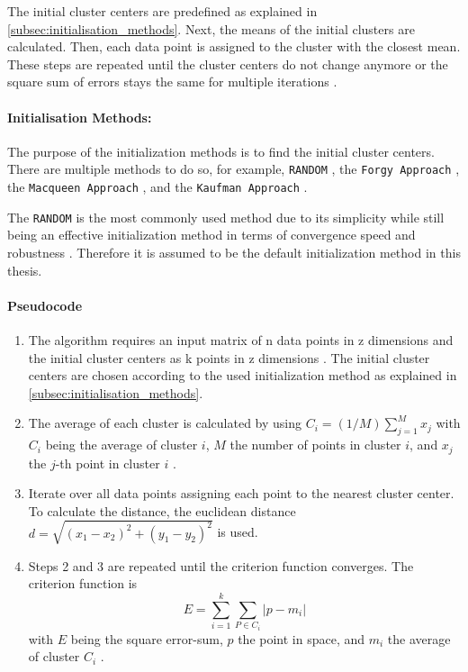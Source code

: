 The initial cluster centers are predefined as explained in \autoref*{subsec:initialisation_methods}.
Next, the means of the initial clusters are calculated.
Then, each data point is assigned to the cluster with the closest mean.
These steps are repeated until the cluster centers do not change anymore or the square sum of errors stays the same for multiple iterations \cite{HAR-KMA}.

\paragraph*{Initialisation Methods:}
\label{subsec:initialisation_methods}
The purpose of the initialization methods is to find the initial cluster centers.
There are multiple methods to do so, for example, \texttt{RANDOM} \cite{PEN-ECI}, the \texttt{Forgy Approach} \cite{AND-CAA}, the \texttt{Macqueen Approach} \cite{MCQ-MCA}, and the \texttt{Kaufman Approach} \cite{KAU-FGD}.

The \texttt{RANDOM} is the most commonly used method due to its simplicity while still being an effective initialization method in terms of convergence speed and robustness \cite{PEN-ECI}.
Therefore it is assumed to be the default initialization method in this thesis.

\paragraph*{Pseudocode}
\begin{enumerate}
    \item The algorithm requires an input matrix of n data points in z dimensions and the initial cluster centers as k points in z dimensions \cite{HAR-KMA}.
          The initial cluster centers are chosen according to the used initialization method as explained in \autoref*{subsec:initialisation_methods}.
    \item The average of each cluster is calculated by using $C_i = (1/M) \sum_{j=1}^{M}x_j$ with $C_i$ being the average of cluster $i$, $M$ the number of points in cluster $i$, and $x_j$ the $j$-th point in cluster $i$ \cite{SYA-IKC}.
    \item Iterate over all data points assigning each point to the nearest cluster center.
          To calculate the distance, the euclidean distance $d = \sqrt{(x_1-x_2)^2+(y_1-y_2)^2}$ is used.
    \item Steps 2 and 3 are repeated until the criterion function converges.
          The criterion function is \begin{equation}\label{eq:sse}E=\sum_{i=1}^{k} \sum_{P \in C_i}|p-m_i|\end{equation} with $E$ being the square error-sum, $p$ the point in space, and $m_i$ the average of cluster $C_i$ \cite{LIU-BDE}.
\end{enumerate}

